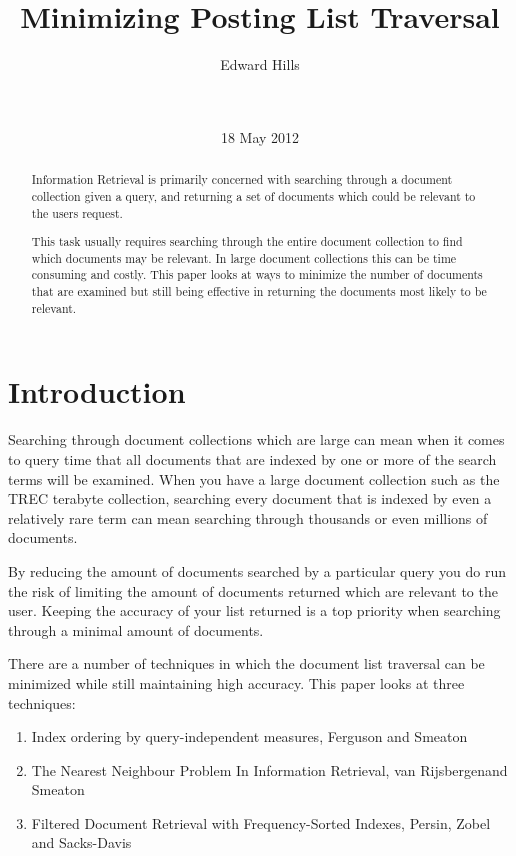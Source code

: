 \documentclass{acm_proc_article-sp}
\begin{document}
\title{Minimizing Posting List Traversal}

\author{
\alignauthor
Edward Hills\\\\
       \\
       }
\date{18 May 2012}

\maketitle
\begin{abstract}

Information Retrieval is primarily concerned with searching through a document collection given a query, and returning a set of documents which could be relevant to the users request. 

This task usually requires searching through the entire document collection to find which documents may be relevant. In large document collections this can be time consuming and costly. This paper looks at ways to minimize the number of documents that are examined but still being effective in returning the documents most likely to be relevant.

\end{abstract}

\section{Introduction}

Searching through document collections which are large can mean when it comes to query time that all documents that are indexed by one or more of the search terms will be examined. When you have a large document collection such as the TREC terabyte collection, searching every document that is indexed by even a relatively rare term can mean searching through thousands or even millions of documents.

By reducing the amount of documents searched by a particular query you do run the risk of limiting the amount of documents returned which are relevant to the user. Keeping the accuracy of your list returned is a top priority when searching through a minimal amount of documents. 

There are a number of techniques in which the document list traversal can be minimized while still maintaining high accuracy. This paper looks at three techniques: 
\begin{enumerate}
\item Index ordering by query-independent measures, Ferguson and Smeaton
\item The Nearest Neighbour Problem In Information Retrieval, van Rijsbergenand Smeaton
\item Filtered Document Retrieval with Frequency-Sorted Indexes, Persin, Zobel and Sacks-Davis
\end{enumerate}
\end{document}
